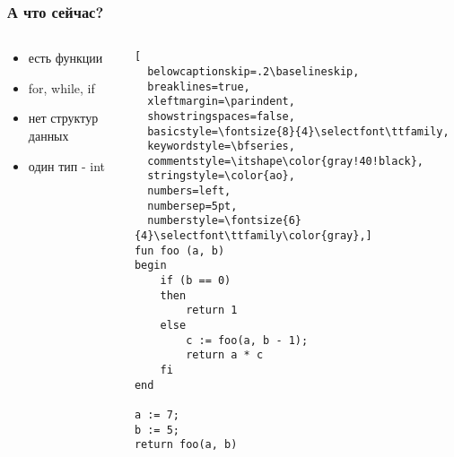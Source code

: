 \documentclass{beamer}
\begin{document}
\begin{frame}[fragile]\frametitle{А что сейчас?}
\begin{columns}
\begin{column}{0.5\textwidth}
\begin{itemize}
\item есть функции
\vfill
\item for, while, if
\vfill
\item нет структур данных
\vfill
\item один тип - int
\end{itemize}
\end{column}
\begin{column}{0.5\textwidth}
\begin{lstlisting}[
  belowcaptionskip=.2\baselineskip,
  breaklines=true,
  xleftmargin=\parindent,
  showstringspaces=false,
  basicstyle=\fontsize{8}{4}\selectfont\ttfamily,
  keywordstyle=\bfseries,
  commentstyle=\itshape\color{gray!40!black},
  stringstyle=\color{ao},
  numbers=left,
  numbersep=5pt,
  numberstyle=\fontsize{6}{4}\selectfont\ttfamily\color{gray},]
fun foo (a, b)
begin
    if (b == 0)
    then
        return 1
    else
        c := foo(a, b - 1);
        return a * c
    fi
end

a := 7;
b := 5;
return foo(a, b) 
\end{lstlisting}
\end{column}
\end{columns}
\end{frame}
\end{document}
